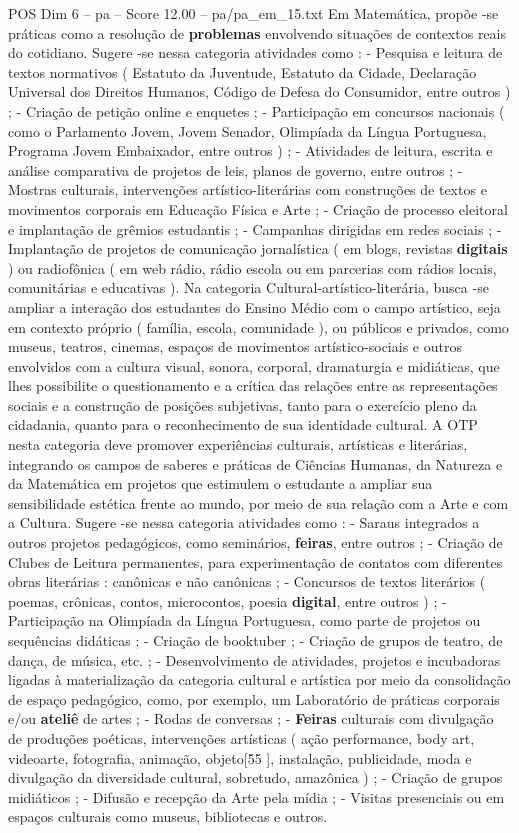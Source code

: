 \begin{textsample}{POS Dim 6 – pa – Score 12.00 – pa/pa\_em\_15.txt}
Em Matemática, propõe -se práticas como a resolução de \textbf{problemas} envolvendo situações de contextos reais do cotidiano.
Sugere -se nessa categoria atividades como : - Pesquisa e leitura de textos normativos ( Estatuto da Juventude, Estatuto da Cidade, Declaração Universal dos Direitos Humanos, Código de Defesa do Consumidor, entre outros ) ; - Criação de petição online e enquetes ; - Participação em concursos nacionais ( como o Parlamento Jovem, Jovem Senador, Olimpíada da Língua Portuguesa, Programa Jovem Embaixador, entre outros ) ; - Atividades de leitura, escrita e análise comparativa de projetos de leis, planos de governo, entre outros ; - Mostras culturais, intervenções artístico-literárias com construções de textos e movimentos corporais em Educação Física e Arte ; - Criação de processo eleitoral e implantação de grêmios estudantis ; - Campanhas dirigidas em redes sociais ; - Implantação de projetos de comunicação jornalística ( em blogs, revistas \textbf{digitais} ) ou radiofônica ( em web rádio, rádio escola ou em parcerias com rádios locais, comunitárias e educativas ).
Na categoria Cultural-artístico-literária, busca -se ampliar a interação dos estudantes do Ensino Médio com o campo artístico, seja em contexto próprio ( família, escola, comunidade ), ou públicos e privados, como museus, teatros, cinemas, espaços de movimentos artístico-sociais e outros envolvidos com a cultura visual, sonora, corporal, dramaturgia e midiáticas, que lhes possibilite o questionamento e a crítica das relações entre as representações sociais e a construção de posições subjetivas, tanto para o exercício pleno da cidadania, quanto para o reconhecimento de sua identidade cultural.
A OTP nesta categoria deve promover experiências culturais, artísticas e literárias, integrando os campos de saberes e práticas de Ciências Humanas, da Natureza e da Matemática em projetos que estimulem o estudante a ampliar sua sensibilidade estética frente ao mundo, por meio de sua relação com a Arte e com a Cultura.
Sugere -se nessa categoria atividades como : - Saraus integrados a outros projetos pedagógicos, como seminários, \textbf{feiras}, entre outros ; - Criação de Clubes de Leitura permanentes, para experimentação de contatos com diferentes obras literárias : canônicas e não canônicas ; - Concursos de textos literários ( poemas, crônicas, contos, microcontos, poesia \textbf{digital}, entre outros ) ; - Participação na Olimpíada da Língua Portuguesa, como parte de projetos ou sequências didáticas ; - Criação de booktuber ; - Criação de grupos de teatro, de dança, de música, etc. ; - Desenvolvimento de atividades, projetos e incubadoras ligadas à materialização da categoria cultural e artística por meio da consolidação de espaço pedagógico, como, por exemplo, um Laboratório de práticas corporais e/ou \textbf{ateliê} de artes ; - Rodas de conversas ; - \textbf{Feiras} culturais com divulgação de produções poéticas, intervenções artísticas ( ação performance, body art, videoarte, fotografia, animação, objeto[55 ], instalação, publicidade, moda e divulgação da diversidade cultural, sobretudo, amazônica ) ; - Criação de grupos midiáticos ; - Difusão e recepção da Arte pela mídia ; - Visitas presenciais ou em espaços culturais como museus, bibliotecas e outros.

\end{textsample}
